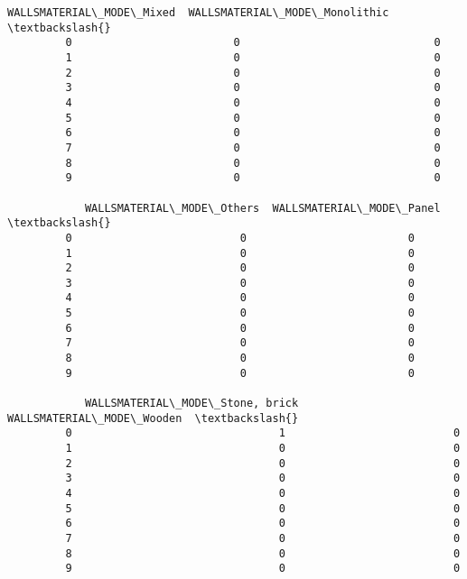 \documentclass[11pt]{article}
\begin{document}
\begin{Verbatim}[commandchars=\\\{\}]
            WALLSMATERIAL\_MODE\_Mixed  WALLSMATERIAL\_MODE\_Monolithic  \textbackslash{}
         0                         0                              0   
         1                         0                              0   
         2                         0                              0   
         3                         0                              0   
         4                         0                              0   
         5                         0                              0   
         6                         0                              0   
         7                         0                              0   
         8                         0                              0   
         9                         0                              0   
         
            WALLSMATERIAL\_MODE\_Others  WALLSMATERIAL\_MODE\_Panel  \textbackslash{}
         0                          0                         0   
         1                          0                         0   
         2                          0                         0   
         3                          0                         0   
         4                          0                         0   
         5                          0                         0   
         6                          0                         0   
         7                          0                         0   
         8                          0                         0   
         9                          0                         0   
         
            WALLSMATERIAL\_MODE\_Stone, brick  WALLSMATERIAL\_MODE\_Wooden  \textbackslash{}
         0                                1                          0   
         1                                0                          0   
         2                                0                          0   
         3                                0                          0   
         4                                0                          0   
         5                                0                          0   
         6                                0                          0   
         7                                0                          0   
         8                                0                          0   
         9                                0                          0   
         

\end{Verbatim}
\end{document}
